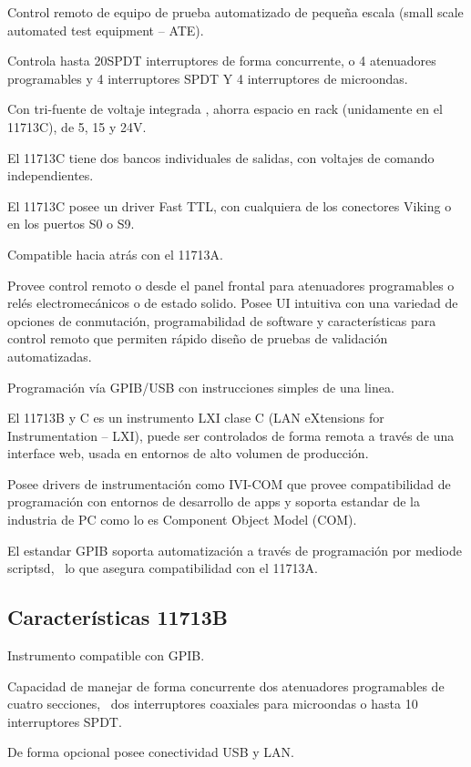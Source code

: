 \documentclass[paper=letter,oneside,fontsize=10pt,parskip=full]{article}
\begin{document}
\bigskip


\bigskip

Control remoto de equipo de prueba automatizado de pequeña escala (small scale automated test equipment – ATE). 

Controla hasta 20SPDT interruptores de forma concurrente, o 4 atenuadores programables y 4 interruptores SPDT Y 4
interruptores de microondas.

Con tri-fuente de voltaje integrada , ahorra espacio en rack (unidamente en el 11713C), de 5, 15 y 24V.

El 11713C tiene dos bancos individuales de salidas, con voltajes de comando independientes.

El 11713C posee un driver Fast TTL, con cualquiera de los conectores Viking o en los puertos S0 o S9.

Compatible hacia atrás con el 11713A.

Provee control remoto o desde el panel frontal para atenuadores programables o relés electromecánicos o de estado
solido. Posee UI intuitiva con una variedad de opciones de conmutación, programabilidad de software y características
para control remoto que permiten rápido diseño de pruebas de validación automatizadas.

Programación vía GPIB/USB con instrucciones simples de una linea.

El 11713B y C es un instrumento LXI clase C (LAN eXtensions for Instrumentation – LXI), puede ser controlados de forma
remota a través de una interface web, usada en entornos de alto volumen de producción. 

Posee drivers de instrumentación como IVI-COM que provee compatibilidad de programación con entornos de desarrollo de
apps y soporta estandar de la industria de PC como lo es Component Object Model (COM).

El estandar GPIB soporta automatización a través de programación por mediode scriptsd, \ lo que asegura compatibilidad
con el 11713A.

\subsection{Características 11713B}
Instrumento compatible con GPIB.

Capacidad de manejar de forma concurrente dos atenuadores programables de cuatro secciones, \ dos interruptores
coaxiales para microondas o hasta 10 interruptores SPDT.

De forma opcional posee conectividad USB y LAN.
\end{document}
